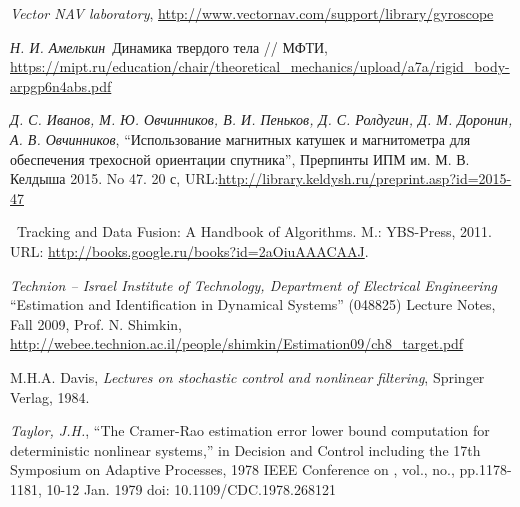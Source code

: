 \documentclass{article}
\begin{document}
\begin{thebibliography}{99}
{\it Vector NAV laboratory}, \url{http://www.vectornav.com/support/library/gyroscope}

{\it Н. И. Амелькин}\,
Динамика твердого тела // МФТИ,
\url{https://mipt.ru/education/chair/theoretical_mechanics/upload/a7a/rigid_body-arpgp6n4abs.pdf}

    {\it Д. С. Иванов, М. Ю. Овчинников, В. И. Пеньков, Д. С. Ролдугин, Д. М.
Доронин, А. В. Овчинников}, ``Использование магнитных катушек и магнитометра для
обеспечения трехосной ориентации спутника'', Прерпинты ИПМ им. М. В. Келдыша
2015. No 47. 20 с, URL:\url{http://library.keldysh.ru/preprint.asp?id=2015-47}

\, Tracking and Data Fusion: A Handbook of Algorithms. M.: YBS-Press, 2011.
URL: \url{http://books.google.ru/books?id=2aOiuAAACAAJ}.

 {\it Technion – Israel Institute of Technology,
    Department of Electrical Engineering} ``Estimation and Identification in
    Dynamical Systems'' (048825)
    Lecture Notes, Fall 2009, Prof. N. Shimkin, \url{http://webee.technion.ac.il/people/shimkin/Estimation09/ch8_target.pdf}

    M.H.A. Davis, {\it Lectures on stochastic control and nonlinear
    filtering}, Springer Verlag, 1984.

{\it Taylor, J.H.}, ``The Cramer-Rao estimation error lower bound computation
for deterministic nonlinear systems,'' in Decision and Control including the 17th Symposium on Adaptive Processes, 1978 IEEE Conference on , vol., no., pp.1178-1181, 10-12 Jan. 1979
doi: 10.1109/CDC.1978.268121

\end{thebibliography}
\end{document}
